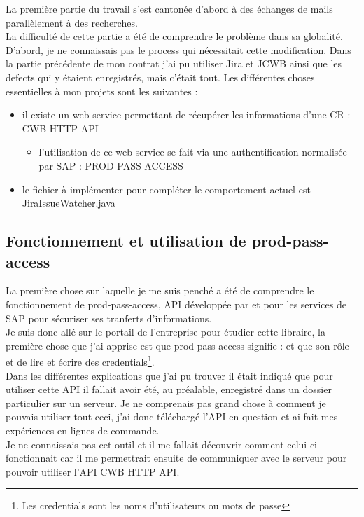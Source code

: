 La première partie du travail s'est cantonée d'abord à des échanges de mails parallèlement à des recherches.\\
La difficulté de cette partie a été de comprendre le problème dans sa globalité. D'abord, je ne connaissais pas le process qui nécessitait cette modification. Dans la partie précédente de mon contrat j'ai pu utiliser Jira et JCWB ainsi que les defects qui y étaient enregistrés, mais c'était tout.
Les différentes choses essentielles à mon projets sont les suivantes :

\begin{itemize}
	\item il existe un web service permettant de récupérer les informations d'une CR : CWB HTTP API
	\begin{itemize}
		\item l'utilisation de ce web service se fait via une authentification normalisée par SAP : PROD-PASS-ACCESS
	\end{itemize}
	\item le fichier à implémenter pour compléter le comportement actuel est JiraIssueWatcher.java	
\end{itemize}




\subsection{Fonctionnement et utilisation de prod-pass-access}
La première chose sur laquelle je me suis penché a été de comprendre le fonctionnement de prod-pass-access, \gls{API} développée par et pour les services de SAP pour sécuriser ses tranferts d'informations.\\
Je suis donc allé sur le portail de l'entreprise pour étudier cette libraire, la première chose que j'ai apprise est que prod-pass-access signifie :  et que son rôle et de lire et écrire des credentials\footnote{Les credentials sont les noms d'utilisateurs ou mots de passe}.\\
Dans les différentes explications que j'ai pu trouver il était indiqué que pour utiliser cette \gls{API} il fallait avoir été, au préalable, enregistré dans un dossier particulier sur un serveur. Je ne comprenais pas grand chose à comment je pouvais utiliser tout ceci, j'ai donc téléchargé l'API en question et ai fait mes expériences en lignes de commande.\\
Je ne connaissais pas cet outil et il me fallait découvrir comment celui-ci fonctionnait car il me permettrait ensuite de communiquer avec le serveur pour pouvoir utiliser l'\gls{API} CWB HTTP API.\\

